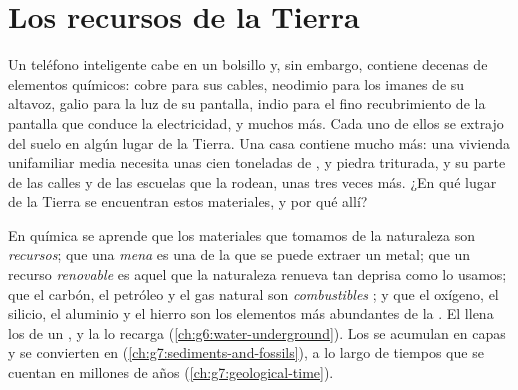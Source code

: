 \chapter{Los recursos de la Tierra}\label{ch:g9:earth-resources}

Un teléfono inteligente cabe en un bolsillo y, sin embargo, contiene
decenas de elementos químicos: cobre para sus cables, neodimio para los
imanes de su altavoz, galio para la luz de su pantalla, indio para el fino
recubrimiento de la pantalla que conduce la electricidad, y muchos más.
Cada uno de ellos se extrajo del suelo en algún lugar de la Tierra. Una
casa contiene mucho más: una vivienda unifamiliar media necesita unas cien
toneladas de ,  y piedra triturada, y su parte de las calles y
de las escuelas que la rodean, unas tres veces más. ¿En qué lugar de la
Tierra se encuentran estos materiales, y por qué allí?

\begin{recall}
En química se aprende que los materiales que tomamos de la naturaleza son
\emph{recursos}; que una \emph{mena} es una  de la que se puede
extraer un metal; que un recurso \emph{renovable} es aquel que la
naturaleza renueva tan deprisa como lo usamos; que el carbón, el petróleo
y el gas natural son \emph{combustibles }; y que el oxígeno, el
silicio, el aluminio y el hierro son los elementos más abundantes de la
. El  llena los  de un , y la 
lo recarga (\cref{ch:g6:water-underground}). Los  se acumulan en
capas y se convierten en 
(\cref{ch:g7:sediments-and-fossils}), a lo largo de tiempos que se cuentan
en millones de años (\cref{ch:g7:geological-time}).
\end{recall}

